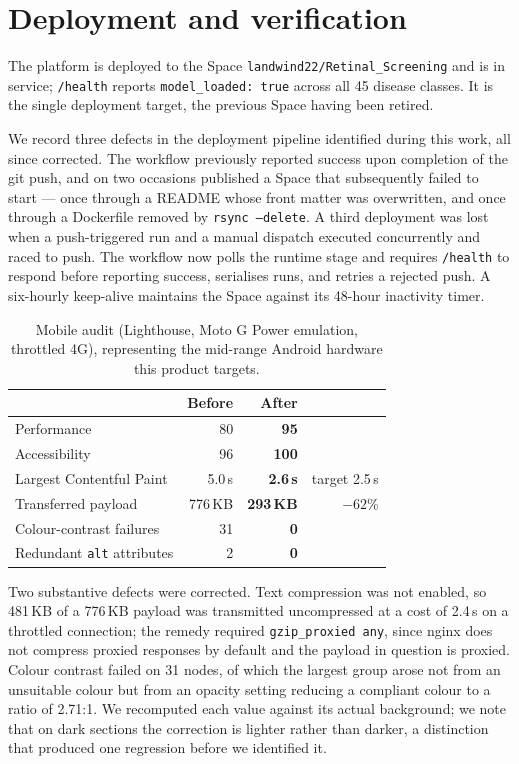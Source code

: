 \documentclass[11pt,a4paper]{article}
\newcommand{\code}[1]{\texttt{\small #1}}
\begin{document}
\section{Deployment and verification}

The platform is deployed to the Space \code{landwind22/Retinal\_Screening} and is
in service; \code{/health} reports \code{model\_loaded: true} across all 45
disease classes. It is the single deployment target, the previous Space having
been retired.

We record three defects in the deployment pipeline identified during this work,
all since corrected. The workflow previously reported success upon completion of
the git push, and on two occasions published a Space that subsequently failed to
start --- once through a README whose front matter was overwritten, and once
through a Dockerfile removed by \code{rsync --delete}. A third deployment was
lost when a push-triggered run and a manual dispatch executed concurrently and
raced to push. The workflow now polls the runtime stage and requires
\code{/health} to respond before reporting success, serialises runs, and retries
a rejected push. A six-hourly keep-alive maintains the Space against its 48-hour
inactivity timer.

\begin{table}[H]
\caption{Mobile audit (Lighthouse, Moto G Power emulation, throttled 4G),
representing the mid-range Android hardware this product targets.}
\begin{tabularx}{\textwidth}{@{}Yrrr@{}}
\toprule
& \textbf{Before} & \textbf{After} & \\
\midrule
Performance                 & 80      & \textbf{95}   & \\
Accessibility               & 96      & \textbf{100}  & \\
Largest Contentful Paint    & 5.0\,s  & \textbf{2.6\,s} & target 2.5\,s \\
Transferred payload         & 776\,KB & \textbf{293\,KB} & $-62$\% \\
Colour-contrast failures    & 31      & \textbf{0}    & \\
Redundant \code{alt} attributes & 2   & \textbf{0}    & \\
\bottomrule
\end{tabularx}
\end{table}

Two substantive defects were corrected. Text compression was not enabled, so
481\,KB of a 776\,KB payload was transmitted uncompressed at a cost of 2.4\,s on
a throttled connection; the remedy required \code{gzip\_proxied any}, since nginx
does not compress proxied responses by default and the payload in question is
proxied. Colour contrast failed on 31 nodes, of which the largest group arose not
from an unsuitable colour but from an opacity setting reducing a compliant
colour to a ratio of 2.71:1. We recomputed each value against its actual
background; we note that on dark sections the correction is lighter rather than
darker, a distinction that produced one regression before we identified it.
\end{document}
